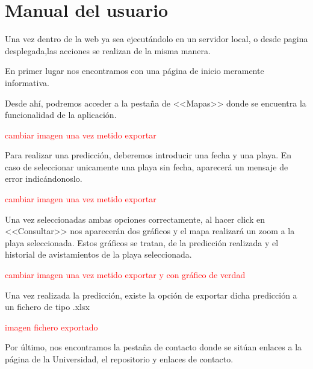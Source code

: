 \section{Manual del usuario}

Una vez dentro de la web ya sea ejecutándolo en un servidor local, o desde
pagina desplegada,las acciones se realizan de la misma manera.

En primer lugar nos encontramos con una página de inicio meramente informativa.

\label{pagina_inicio}

Desde ahí, podremos acceder a la pestaña de <<Mapas>> donde se encuentra la funcionalidad de la aplicación.

\label{pagina_mapas_web}
\textcolor{red}{cambiar imagen una vez metido exportar}

Para realizar una predicción, deberemos introducir una fecha y una playa. En caso de seleccionar unicamente una playa sin fecha, aparecerá un mensaje de error indicándonoslo.

\label{pagina_error_fecha}
\textcolor{red}{cambiar imagen una vez metido exportar}

Una vez seleccionadas ambas opciones correctamente, al hacer click en <<Consultar>> nos aparecerán dos gráficos y el mapa realizará un zoom a la playa seleccionada. Estos gráficos se tratan, de la predicción realizada y el historial de avistamientos de la playa seleccionada. 

\label{pagina_consulta}
\textcolor{red}{cambiar imagen una vez metido exportar y con gráfico de verdad}

Una vez realizada la predicción, existe la opción de exportar dicha predicción a un fichero de tipo .xlsx

\textcolor{red}{imagen fichero exportado}

Por último, nos encontramos la pestaña de contacto donde se sitúan enlaces a la página de la Universidad, el repositorio y enlaces de contacto.

\label{pagina_contacto}